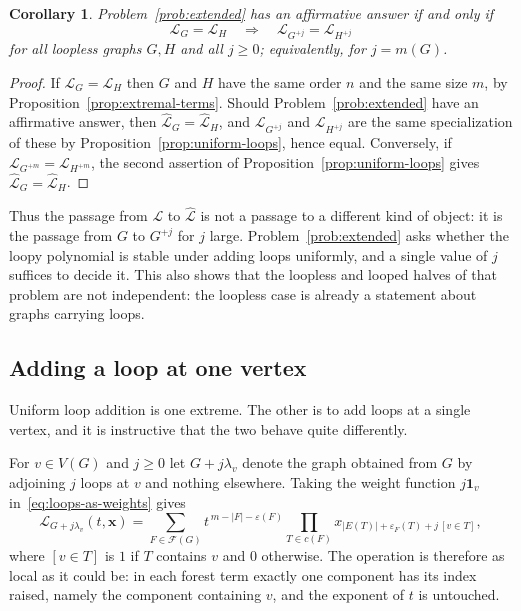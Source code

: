 \documentclass[11pt]{article}
\theoremstyle{plain}
\newtheorem{corollary}[theorem]{Corollary}
\theoremstyle{definition}
\renewcommand{\mathcal}{\mathscr}
\newcommand{\LL}{\mathcal{L}}    %
\newcommand{\cF}{\mathcal{F}}    %
\newcommand{\bx}{\mathbf{x}}
\newcommand{\bOne}{\mathbf{1}}
\newcommand{\eps}{\varepsilon}
\numberwithin{equation}{section}
\begin{document}
\begin{corollary}\label{cor:extended-reformulated}
Problem~\ref{prob:extended} has an affirmative answer if and only if
\[
   \LL_{G}=\LL_{H}
   \quad\Longrightarrow\quad
   \LL_{G^{+j}}=\LL_{H^{+j}}
\]
for all loopless graphs $G,H$ and all $j\ge 0$; equivalently, for $j=m(G)$.
\end{corollary}

\begin{proof}
  If $\LL_G=\LL_H$ then $G$ and $H$ have the same order $n$ and the same size $m$, by Proposition~\ref{prop:extremal-terms}.
Should Problem~\ref{prob:extended} have an affirmative answer, then
$\widehat{\LL}_G=\widehat{\LL}_H$, and $\LL_{G^{+j}}$ and $\LL_{H^{+j}}$ are
the same specialization of these by
Proposition~\ref{prop:uniform-loops}, hence equal.  Conversely, if
$\LL_{G^{+m}}=\LL_{H^{+m}}$, the second assertion of
Proposition~\ref{prop:uniform-loops} gives
$\widehat{\LL}_G=\widehat{\LL}_H$.
\end{proof}

Thus the passage from $\LL$ to $\widehat{\LL}$ is not a passage to a different kind of object:
it is the passage from $G$ to $G^{+j}$ for $j$ large.
Problem~\ref{prob:extended} asks whether the loopy polynomial is stable under adding loops uniformly,
and a single value of $j$ suffices to decide it.
This also shows that the loopless and looped halves of that problem are not independent:
the loopless case is already a statement about graphs carrying loops.

\subsection{Adding a loop at one vertex}\label{subsec:single-loop}

Uniform loop addition is one extreme.  The other is to add loops at a single vertex, and it is
instructive that the two behave quite differently.

For $v\in V(G)$ and $j\ge 0$ let $G+j\lambda_v$ denote the graph obtained from $G$
by adjoining $j$ loops at $v$ and nothing elsewhere.
Taking the weight function $j\bOne_v$ in~\eqref{eq:loops-as-weights} gives
\begin{equation}\label{eq:single-loop}
 \LL_{G+j\lambda_v}(t,\bx)  =  \sum_{F\in\cF(G)}  t^{\,m-|F|-\eps(F)}
      \prod_{T\in c(F)} x_{|E(T)|+\eps_F(T)+j\,[v\in T]} ,
\end{equation}
where $[v\in T]$ is $1$ if $T$ contains $v$ and $0$ otherwise.  The
operation is therefore as local as it could be: in each forest term exactly
one component has its index raised, namely the component containing $v$,
and the exponent of $t$ is untouched.
\end{document}

